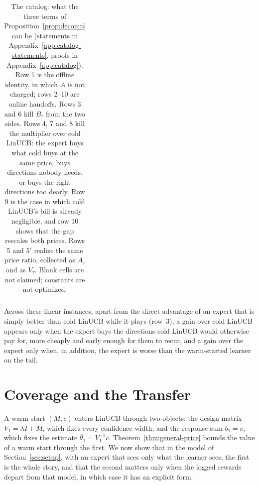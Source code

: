 \documentclass{article}
\theoremstyle{definition}
\theoremstyle{remark}
\theoremstyle{remark}
\begin{document}
\begin{table}[t]
\begin{tabular}{@{}clccccl@{}}
\bottomrule
\end{tabular}
\caption{The catalog: what the three terms of Proposition~\ref{prop:decomp}
can be (statements in Appendix~\ref{app:catalog-statements}, proofs in
Appendix~\ref{app:catalog}). Row 1 is the offline identity, in which $A$ is
not charged; rows 2--10 are online handoffs. Rows 3 and 6 kill $B_\tau$ from
the two sides. Rows 4, 7 and 8 kill the multiplier over cold LinUCB: the
expert buys what cold buys at the same price, buys directions nobody needs,
or buys the right directions too dearly. Row 9 is the case in which cold
LinUCB's bill is already negligible, and row 10 shows that the gap rescales
both prices. Rows 5 and $5'$ realize the same price ratio, collected as
$A_\tau$ and as $V_\tau$. Blank cells are not claimed; constants are not
optimized.}
\label{tab:catalog}
\end{table}

Across these linear instances, apart from the direct advantage of an expert
that is simply better than cold LinUCB while it plays (row~3), a gain over
cold LinUCB appears only when the expert buys the directions cold LinUCB would
otherwise pay for, more cheaply and early enough for them to recur, and a
gain over the expert only when, in addition, the expert is worse than the
warm-started learner on the tail.

\section{Coverage and the Transfer}
\label{sec:two-channels}

A warm start $(M,c)$ enters LinUCB through two objects: the design matrix
$V_1=\lambda I+M$, which fixes every confidence width, and the response sum
$b_1=c$, which fixes the estimate $\widehat\theta_1=V_1^{-1}c$.
Theorem~\ref{thm:general-price} bounds the value of a warm start through the
first. We now show that in the model of Section~\ref{sec:setup}, with an
expert that sees only what the learner sees, the first is the whole story,
and that the second matters only when the logged rewards depart from that
model, in which case it has an explicit form.
\end{document}
